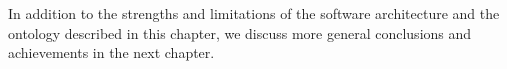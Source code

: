 
In addition to the strengths and limitations of the software architecture and the ontology described in this chapter, we discuss more general conclusions and achievements in the next chapter.



% 
% 
% 
